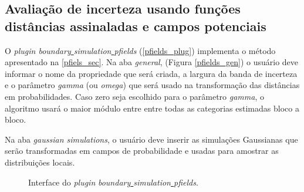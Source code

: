 \subsection{Avaliação de incerteza usando funções distâncias assinaladas e campos potenciais}

O \textit{plugin boundary\underline{ }simulation\underline{ }pfields} (\autoref{pfields_plug}) implementa o método apresentado na \autoref{pfiels_sec}. Na aba \textit{general}, (Figura \autoref{pfields_gen}) o usuário deve informar o nome da propriedade que será criada, a largura da banda de incerteza e o parâmetro \textit{gamma} (ou \textit{omega}) que será usado na transformação das distâncias em probabilidades. Caso zero seja escolhido para o parâmetro \textit{gamma}, o algoritmo usará o maior módulo entre entre todas as categorias estimadas bloco a bloco.

Na aba \textit{gaussian simulations}, o usuário deve inserir as simulações Gaussianas que serão transformadas em campos de probabilidade e usadas para amostrar as distribuições locais.

\begin{figure}[H] 
    \centering
    \caption{Interface do \textit{plugin} \textit{boundary\underline{ }simulation\underline{ }pfields}.} \label{pfields_plug}
     \hspace{1em}
\end{figure}

